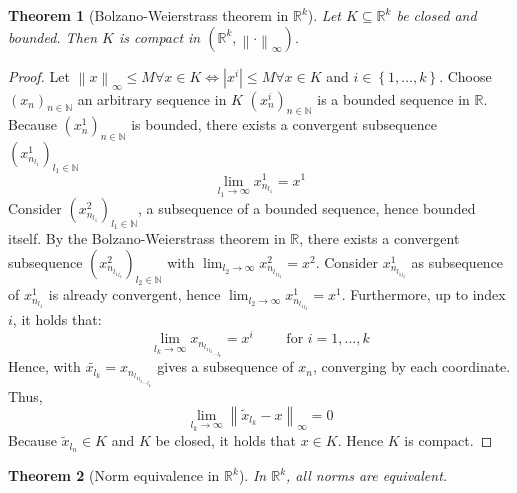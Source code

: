 \documentclass{article}
\newtheorem{theorem}{Theorem}  \numberwithin{theorem}{section}
\newcommand{\set}[1]{\left\{#1\right\}}
\newcommand{\norm}[1]{\left\|#1\right\|}
\newcommand{\card}[1]{\left|#1\right|}
\begin{document}
\begin{theorem}[Bolzano-Weierstrass theorem in $\mathbb R^k$]
  Let $K \subseteq \mathbb R^k$ be closed and bounded.
  Then $K$ is compact in $(\mathbb R^k, \norm{\cdot}_{\infty})$.
\end{theorem}

\begin{proof}
  Let $\norm{x}_{\infty} \leq M \forall x \in K \iff \card{x^i} \leq M \forall x \in K$ and $i \in \set{1, \dots, k}$.
  Choose $(x_n)_{n \in \mathbb N}$ an arbitrary sequence in $K$ $(x_n^i)_{n \in \mathbb N}$ is a bounded sequence in $\mathbb R$.
  Because $(x_n^1)_{n \in \mathbb N}$ is bounded, there exists a convergent subsequence $\left(x_{n_{l_1}}^1\right)_{l_1 \in \mathbb N}$
  \[ \lim_{l_1 \to \infty} x_{n_{l_1}}^1 = x^1 \]
  Consider $(x_{n_{l_1}}^2)_{l_1 \in \mathbb N}$, a subsequence of a bounded sequence, hence bounded itself.
  By the Bolzano-Weierstrass theorem in $\mathbb R$, there exists a convergent subsequence $(x_{n_{{l_1}_{l_2}}}^2)_{l_2 \in \mathbb N}$ with $\lim_{l_2 \to \infty} x_{n_{{l_1}_{l_2}}}^2 = x^2$.
  Consider $x_{n_{{l_1}_{l_2}}}^1$ as subsequence of $x_{n_{l_1}}^1$ is already convergent, hence $\lim_{l_2 \to \infty} x_{n_{{l_1}_{l_2}}}^1 = x^1$. Furthermore, up to index $i$, it holds that:
  \[ \lim_{l_k \to \infty} x_{n_{{{{l_1}_{l_2}}_{\ldots}}_{l_k}}} = x^i \qquad \text{ for } i = 1, \dots, k \]
  Hence, with $\tilde{x_{l_k}} = x_{n_{{{{l_1}_{l_2}}_{\ldots}}_{l_k}}}$ gives a subsequence of $x_n$, converging by each coordinate. Thus,
  \[ \lim_{l_k \to \infty} \norm{\tilde{x}_{l_k} - x}_{\infty} = 0 \]
  Because $\tilde{x}_{l_n} \in K$ and $K$ be closed, it holds that $x \in K$.
  Hence $K$ is compact.
\end{proof}

\begin{theorem}[Norm equivalence in $\mathbb R^k$] %
  In $\mathbb R^k$, all norms are equivalent.
\end{theorem}
\end{document}
